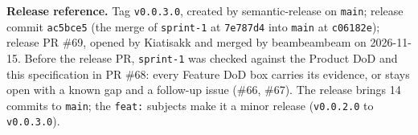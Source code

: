 \textbf{Release reference.} Tag \texttt{v0.0.3.0}, created by semantic-release on \texttt{main}; release commit \texttt{ac5bce5} (the merge of \texttt{sprint-1} at \texttt{7e787d4} into \texttt{main} at \texttt{c06182e}); release PR \#69, opened by Kiatisakk and merged by beambeambeam on 2026-11-15.
Before the release PR, \texttt{sprint-1} was checked against the Product DoD and this specification in PR \#68: every Feature DoD box carries its evidence, or stays open with a known gap and a follow-up issue (\#66, \#67).
The release brings 14 commits to \texttt{main}; the \texttt{feat:} subjects make it a minor release (\texttt{v0.0.2.0} to \texttt{v0.0.3.0}).
